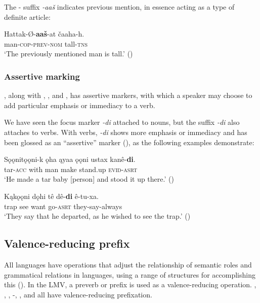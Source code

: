 \documentclass[output=paper]{LSP/langsci}
\begin{document}
	The - suffix \emph{-aaš} indicates previous mention, in essence acting as a type of definite article:

\ea
\gll	Hattak-Ø-\textbf{aaš}-at čaaha-h.\\
	man-\textsc{cop-prev-nom} tall-\textsc{tns} \\
\glt `The previously mentioned man is tall.' 
(\citealt[89]{Broadwell2006})
\z

\subsubsection{Assertive marking}

, along with , , and , has assertive markers, with which a speaker may choose to add particular emphasis or immediacy to a verb. 

	We have seen the  focus marker \emph{-di} attached to nouns, but the suffix \emph{-di} also attaches to verbs. With verbs, \emph{-di} shows more emphasis or immediacy and has been glossed as an “assertive” marker (\citealt[3]{Kaufman2011}), as the following examples demonstrate:

\ea
\gll	Sǫǫnitǫǫni-k ǫha ąyaa ǫǫni ustax kanê-\textbf{di}. \\
	tar-\textsc{acc}  with man make stand.up \textsc{evid-asrt}\\
\glt `He made a tar baby [person] and stood it up there.' (\citealt[13]{DorseySwanton1912})
\z

\ea
\gll	Kąkǫǫni dǫhi tê dê-\textbf{di} ê-tu-xa.\\
	trap 	 see want go-\textsc{asrt} they-say-always\\
\glt `They say that he departed, as he wished to see the trap.' (\citealt[184]{DorseySwanton1912})
\z

\subsection{Valence-reducing prefix}

All languages have operations that adjust the relationship of semantic roles and grammatical relations in languages, using a range of structures for accomplishing this (\citealt[169]{Payne1997}). In the LMV, a preverb or prefix is used as a valence-reducing operation. , , , -, , and  all have valence-reducing prefixation. 	
\end{document}
